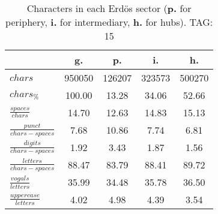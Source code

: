 \begin{table}[h!]
\begin{center}
\begin{tabular}{| l || c | c | c | c |}\hline
 & {\bf g.} & {\bf p.} & {\bf i.} & {\bf h.} \\\hline\hline
$chars$ & 950050  & 126207  & 323573  & 500270 \\
$chars_{\%}$ & 100.00  & 13.28  & 34.06  & 52.66 \\\hline
$\frac{spaces}{chars}$ & 14.70  & 12.63  & 14.83  & 15.13 \\
$\frac{punct}{chars-spaces}$ & 7.68  & 10.86  & 7.74  & 6.81 \\
$\frac{digits}{chars-spaces}$ & 1.92  & 3.43  & 1.87  & 1.56 \\\hline
$\frac{letters}{chars-spaces}$ & 88.47  & 83.79  & 88.41  & 89.72 \\
$\frac{vogals}{letters}$ & 35.99  & 34.48  & 35.78  & 36.50 \\
$\frac{uppercase}{letters}$ & 4.02  & 4.98  & 4.39  & 3.54 \\\hline
\end{tabular}
\caption{Characters in each Erd\"os sector ({{\bf p.}} for periphery, {{\bf i.}} for intermediary, 
    {{\bf h.}} for hubs). TAG: 15}
\end{center}
\end{table}